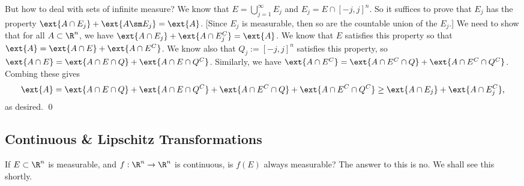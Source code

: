 But how to deal with sets of infinite measure? We know that $E= \bigcup_{j=1}^\infty E_j$ and $E_j= E \cap [-j,j]^n$. So it suffices to prove that $E_j$ has the property $\ext{A \cap E_j}+\ext{A\sm E_j}=\ext{A}$. [Since $E_j$ is measurable, then so are the countable union of the $E_j$.] We need to show that for all $A \subset \R^n$, we have $\ext{A \cap E_j} + \ext{A \cap E_j^C}=\ext{A}$. We know that $E$ satisfies this property so that $\ext{A}= \ext{A \cap E} + \ext{A \cap E^C}$. We know also that $Q_j:= [-j,j]^n$ satisfies this property, so $\ext{A \cap E}= \ext{A \cap E \cap Q}+ \ext{A \cap E \cap Q^C}$. Similarly, we have $\ext{A \cap E^C}= \ext{A \cap E^C \cap Q}+ \ext{A \cap E^C \cap Q^C}$. Combing these gives
	\[
	\ext{A}= \ext{A \cap E \cap Q} + \ext{A \cap E \cap Q^C} + \ext{A \cap E^C \cap Q}+ \ext{A \cap E^C \cap Q^C} \geq \ext{A \cap E_j} + \ext{A \cap E_j^C},
	\]
as desired. \qed \\















\subsection{Continuous \& Lipschitz Transformations}

If $E \subset \R^n$ is measurable, and $f: \R^n \to \R^n$ is continuous, is $f(E)$ always measurable? The answer to this is no. We shall see this shortly. 


